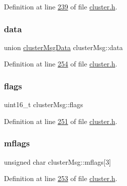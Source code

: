 Definition at line \hyperlink{cluster_8h_source_l00239}{239} of file \hyperlink{cluster_8h_source}{cluster.\+h}.

\mbox{\label{structclusterMsg_ae4a26a803883a1351225a9e12ede60a4}} 
\subsubsection{\texorpdfstring{data}{data}}
{\footnotesize\ttfamily union \hyperlink{unionclusterMsgData}{cluster\+Msg\+Data} cluster\+Msg\+::data}



Definition at line \hyperlink{cluster_8h_source_l00254}{254} of file \hyperlink{cluster_8h_source}{cluster.\+h}.

\mbox{\label{structclusterMsg_a2f5c02fb1d61410470cbfa32942fb745}} 
\subsubsection{\texorpdfstring{flags}{flags}}
{\footnotesize\ttfamily uint16\+\_\+t cluster\+Msg\+::flags}



Definition at line \hyperlink{cluster_8h_source_l00251}{251} of file \hyperlink{cluster_8h_source}{cluster.\+h}.

\mbox{\label{structclusterMsg_a1e6c3ad5211fb97e8ce03d35cc2ff747}} 
\subsubsection{\texorpdfstring{mflags}{mflags}}
{\footnotesize\ttfamily unsigned char cluster\+Msg\+::mflags\mbox{[}3\mbox{]}}



Definition at line \hyperlink{cluster_8h_source_l00253}{253} of file \hyperlink{cluster_8h_source}{cluster.\+h}.

\mbox{\label{structclusterMsg_a4cecbddb92257abd32c3f3bfdb716614}} 
